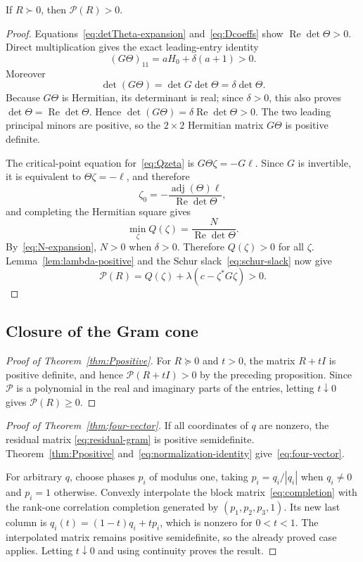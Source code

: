 \documentclass[10pt,twoside]{siamart1116}
\newcommand{\Rea}{\operatorname{Re}}
\newcommand{\adj}{\operatorname{adj}}
\newcommand{\psd}{\succeq 0}
\newcommand{\pd}{\succ 0}
\begin{document}
\begin{proposition}
If $R\pd$, then $\mathcal P(R)>0$.
\end{proposition}

\begin{proof}
Equations~\eqref{eq:detTheta-expansion} and~\eqref{eq:Dcoeffs} show
$\Rea\det\Theta>0$.  Direct multiplication gives the exact leading-entry
identity
\begin{equation}\label{eq:GTheta-leading}
 (G\Theta)_{11}=aH_0+\delta(a+1)>0.
\end{equation}
Moreover
\[
 \det(G\Theta)=\det G\det\Theta=\delta\det\Theta.
\]
Because $G\Theta$ is Hermitian, its determinant is real; since $\delta>0$,
this also proves $\det\Theta=\Rea\det\Theta$.  Hence
$\det(G\Theta)=\delta\Rea\det\Theta>0$.  The two leading principal minors
are positive, so the $2\times2$ Hermitian matrix $G\Theta$ is positive
definite.

The critical-point equation for~\eqref{eq:Qzeta} is
$G\Theta\zeta=-G\ell$.  Since $G$ is invertible, it is equivalent to
$\Theta\zeta=-\ell$, and therefore
\[
 \zeta_0=-\frac{\adj(\Theta)\ell}{\Rea\det\Theta},
\]
and completing the Hermitian square gives
\[
 \min_\zeta Q(\zeta)=\frac{N}{\Rea\det\Theta}.
\]
By~\eqref{eq:N-expansion}, $N>0$ when $\delta>0$.  Therefore
$Q(\zeta)>0$ for all $\zeta$.  Lemma~\ref{lem:lambda-positive} and the Schur
slack~\eqref{eq:schur-slack} now give
\[
 \mathcal P(R)=Q(\zeta)+\lambda(c-\zeta^*G\zeta)>0.
\]
\end{proof}

\subsection{Closure of the Gram cone}

\begin{proof}[Proof of Theorem~\ref{thm:Ppositive}]
For $R\psd$ and $t>0$, the matrix $R+tI$ is positive definite, and hence
$\mathcal P(R+tI)>0$ by the preceding proposition.  Since
$\mathcal P$ is a polynomial in the real and imaginary parts of the entries,
letting $t\downarrow0$ gives $\mathcal P(R)\geq0$.
\end{proof}

\begin{proof}[Proof of Theorem~\ref{thm:four-vector}]
If all coordinates of $q$ are nonzero, the residual matrix
\eqref{eq:residual-gram} is positive semidefinite.  Theorem~\ref{thm:Ppositive}
and~\eqref{eq:normalization-identity} give~\eqref{eq:four-vector}.

For arbitrary $q$, choose phases $p_i$ of modulus one, taking
$p_i=q_i/|q_i|$ when $q_i\neq0$ and $p_i=1$ otherwise.  Convexly interpolate
the block matrix~\eqref{eq:completion} with the rank-one correlation
completion generated by $(p_1,p_2,p_3,1)$.  Its new last column is
$q_i(t)=(1-t)q_i+tp_i$, which is nonzero for $0<t<1$.  The interpolated
matrix remains positive semidefinite, so the already proved case applies.
Letting $t\downarrow0$ and using continuity proves the result.
\end{proof}
\end{document}
